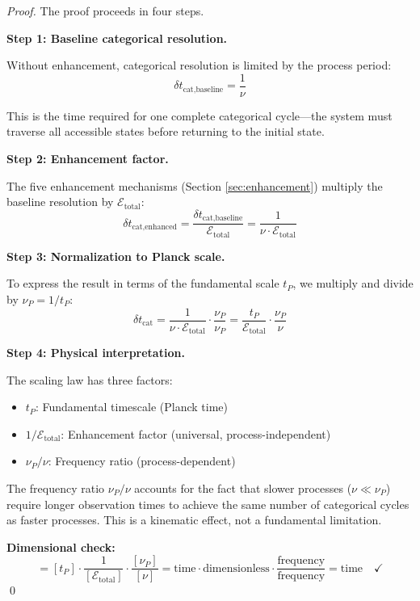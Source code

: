 \documentclass[twocolumn,10pt]{article}
\theoremstyle{remark}
\begin{document}
\begin{proof}
The proof proceeds in four steps.

\textbf{Step 1: Baseline categorical resolution.}

Without enhancement, categorical resolution is limited by the process period:
\begin{equation}
    \delta t_{\text{cat,baseline}} = \frac{1}{\nu}
    \label{eq:baseline_resolution}
\end{equation}

This is the time required for one complete categorical cycle—the system must traverse all accessible states before returning to the initial state.

\textbf{Step 2: Enhancement factor.}

The five enhancement mechanisms (Section \ref{sec:enhancement}) multiply the baseline resolution by $\mathcal{E}_{\text{total}}$:
\begin{equation}
    \delta t_{\text{cat,enhanced}} = \frac{\delta t_{\text{cat,baseline}}}{\mathcal{E}_{\text{total}}} = \frac{1}{\nu \cdot \mathcal{E}_{\text{total}}}
    \label{eq:enhanced_resolution_step2}
\end{equation}

\textbf{Step 3: Normalization to Planck scale.}

To express the result in terms of the fundamental scale $t_P$, we multiply and divide by $\nu_P = 1/t_P$:
\begin{equation}
    \delta t_{\text{cat}} = \frac{1}{\nu \cdot \mathcal{E}_{\text{total}}} \cdot \frac{\nu_P}{\nu_P} = \frac{t_P}{\mathcal{E}_{\text{total}}} \cdot \frac{\nu_P}{\nu}
    \label{eq:scaling_derivation}
\end{equation}

\textbf{Step 4: Physical interpretation.}

The scaling law has three factors:
\begin{itemize}
    \item $t_P$: Fundamental timescale (Planck time)
    \item $1/\mathcal{E}_{\text{total}}$: Enhancement factor (universal, process-independent)
    \item $\nu_P/\nu$: Frequency ratio (process-dependent)
\end{itemize}

The frequency ratio $\nu_P/\nu$ accounts for the fact that slower processes ($\nu \ll \nu_P$) require longer observation times to achieve the same number of categorical cycles as faster processes. This is a kinematic effect, not a fundamental limitation.

\textbf{Dimensional check:}
\begin{equation}
    [\delta t_{\text{cat}}] = [t_P] \cdot \frac{1}{[\mathcal{E}_{\text{total}}]} \cdot \frac{[\nu_P]}{[\nu]} = \text{time} \cdot \text{dimensionless} \cdot \frac{\text{frequency}}{\text{frequency}} = \text{time} \quad \checkmark
    \label{eq:dimensional_check}
\end{equation}
\qed
\end{proof}
\end{document}
